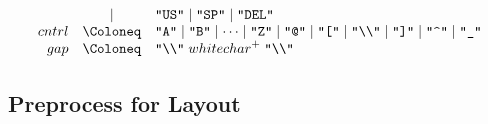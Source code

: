 \begin{align*}
\begin{array}{rcl}
    \\
    & \mid & \text{\texttt{\textquotedbl US\textquotedbl}}
    \mid \text{\texttt{\textquotedbl SP\textquotedbl}}
    \mid \text{\texttt{\textquotedbl DEL\textquotedbl}}
    \\
    {cntrl}
    & \Coloneq & \text{\texttt{\textquotedbl A\textquotedbl}} \mid \text{\texttt{\textquotedbl B\textquotedbl}} \mid \cdots \mid \text{\texttt{\textquotedbl Z\textquotedbl}}
    \mid \text{\texttt{\textquotedbl @\textquotedbl}}
    \mid \text{\texttt{\textquotedbl [\textquotedbl}}
    \mid \text{\texttt{\textquotedbl\textbackslash\textbackslash\textquotedbl}}
    \mid \text{\texttt{\textquotedbl ]\textquotedbl}}
    \mid \text{\texttt{\textquotedbl\textasciicircum\textquotedbl}}
    \mid \text{\texttt{\textquotedbl\textunderscore\textquotedbl}}
    \\
    {gap}
    & \Coloneq & \text{\texttt{\textquotedbl\textbackslash\textbackslash\textquotedbl}}\; {whitechar}^+\; \text{\texttt{\textquotedbl\textbackslash\textbackslash\textquotedbl}}
  \end{array}
\end{align*}

\subsection{Preprocess for Layout}

